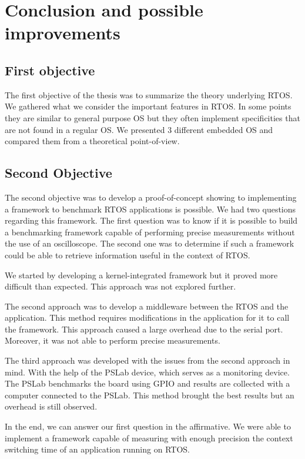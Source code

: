 \chapter*{Conclusion and possible improvements}

\section*{First objective}
The first objective of the thesis was to summarize the theory underlying RTOS.
We gathered what we consider the important features in RTOS.
In some points they are similar to general purpose OS but they often implement specificities that are not found in a regular OS.
We presented 3 different embedded OS and compared them from a theoretical point-of-view.

\section*{Second Objective}
The second objective was to develop a proof-of-concept showing to implementing a framework to benchmark RTOS applications is possible.
We had two questions regarding this framework.
The first question was to know if it is possible to build a benchmarking framework capable of performing precise measurements without the use of an oscilloscope.
The second one was to determine if such a framework could be able to retrieve information useful in the context of RTOS.

We started by developing a kernel-integrated framework but it proved more difficult than expected.
This approach was not explored further.

The second approach was to develop a middleware between the RTOS and the application.
This method requires modifications in the application for it to call the framework.
This approach caused a large overhead due to the serial port.
Moreover, it was not able to perform precise measurements.

The third approach was developed with the issues from the second approach in mind.
With the help of the PSLab device, which serves as a monitoring device.
The PSLab benchmarks the board using GPIO and results are collected with a computer connected to the PSLab.
This method brought the best results but an overhead is still observed.

In the end, we can answer our first question in the affirmative.
We were able to implement a framework capable of measuring with enough precision the context switching time of an application running on RTOS.

